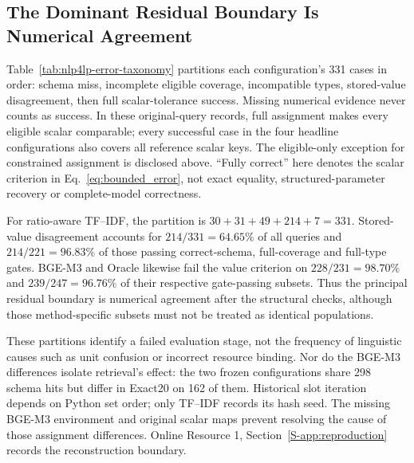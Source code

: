 \documentclass[pdflatex,iicol,sn-basic,Numbered]{sn-jnl}
\begin{document}
\subsection{The Dominant Residual Boundary Is Numerical Agreement}
\label{subsec:exp_error}
Table~\ref{tab:nlp4lp-error-taxonomy} partitions each configuration's 331 cases in order: schema miss, incomplete eligible coverage, incompatible types, stored-value disagreement, then full scalar-tolerance success. Missing numerical evidence never counts as success. In these original-query records, full assignment makes every eligible scalar comparable; every successful case in the four headline configurations also covers all reference scalar keys. The eligible-only exception for constrained assignment is disclosed above. ``Fully correct'' here denotes the scalar criterion in Eq.~\eqref{eq:bounded_error}, not exact equality, structured-parameter recovery or complete-model correctness.

For ratio-aware TF--IDF, the partition is $30+31+49+214+7=331$. Stored-value disagreement accounts for $214/331=64.65\%$ of all queries and $214/221=96.83\%$ of those passing correct-schema, full-coverage and full-type gates. BGE-M3 and Oracle likewise fail the value criterion on $228/231=98.70\%$ and $239/247=96.76\%$ of their respective gate-passing subsets. Thus the principal residual boundary is numerical agreement after the structural checks, although those method-specific subsets must not be treated as identical populations.

These partitions identify a failed evaluation stage, not the frequency of linguistic causes such as unit confusion or incorrect resource binding. Nor do the BGE-M3 differences isolate retrieval's effect: the two frozen configurations share 298 schema hits but differ in Exact20 on 162 of them. Historical slot iteration depends on Python set order; only TF--IDF records its hash seed. The missing BGE-M3 environment and original scalar maps prevent resolving the cause of those assignment differences. Online Resource 1, Section~\ref{S-app:reproduction} records the reconstruction boundary.
\end{document}
